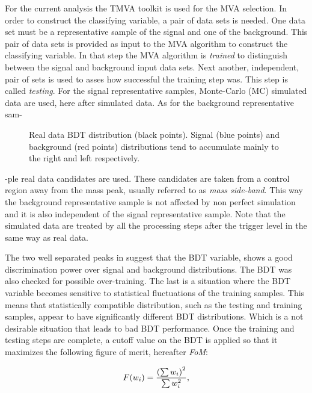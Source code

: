 For the current analysis the TMVA toolkit\cite{TMVA} is used for the MVA selection. In order to construct the classifying variable,
a pair of data sets is needed. One data set must be a representative sample of the signal and one of the background.
This pair of data sets is provided as input to the MVA algorithm to construct the classifying variable.
In that step the MVA algorithm is {\it trained} to distinguish between the signal and background input data sets.
Next another, independent, pair of sets is used to asses how successful the training step was. This step is called {\it testing}.
For the signal representative samples, \BsJpsiKst Monte-Carlo (MC) simulated data are used, here after simulated data.
As for the background representative sam-

\begin{figure}[!t]
\centering
  \scalebox{1}{}
  \caption{Real data BDT distribution (black points). Signal (blue points) and background (red points) distributions
           tend to accumulate mainly to the right and left respectively.}
  \label{BTDG_performance}
\end{figure}

\noindent -ple real data candidates are used. These candidates are taken from a control
region away from the \BsJpsiKst mass peak, usually referred to as {\it mass side-band}. This way the background representative sample
is not affected by non perfect simulation and it is also independent of the signal representative sample.
Note that the simulated data are treated by all the processing steps after the \lone trigger level in the same way as real data.

The two well separated peaks in  suggest that the BDT variable, shows a good discrimination
power over signal and background distributions. The BDT was also checked for possible over-training. The last is a
situation where the BDT variable becomes sensitive to statistical fluctuations of the training samples.
This means that statistically compatible distribution, such as the testing and training samples,
appear to have significantly different BDT distributions. Which is a not desirable situation that leads to
bad BDT performance. Once the training and testing steps are complete, a cutoff value on the BDT is applied
so that it maximizes the following figure of merit, hereafter {\it FoM}:

\begin{equation}
  \centering
  F(w_i) = \frac{\left(\sum{w_{i}}\right)^2}{\sum{w_{i}^2}},
\label{eqn:fom}
\end{equation}

